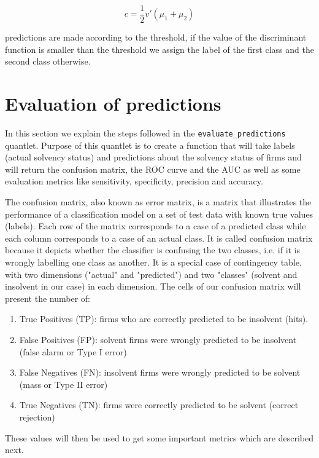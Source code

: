 \documentclass{article}
\begin{document}
\begin{equation}
c = \frac{1}{2} v \prime \left(\mu_1 + \mu_2\right) 
\end{equation}

predictions are made according to the threshold, if the value of the discriminant function is smaller than the threshold we assign the label of the first class and the second class otherwise. 

\section{Evaluation of predictions}

In this section we explain the steps followed in the \texttt{evaluate\_predictions} quantlet. Purpose of this quantlet is to create a function that will take labels (actual solvency status) and predictions about the solvency status of firms and will return the confusion matrix, the ROC curve and the AUC as well as some evaluation metrics like sensitivity, specificity, precision and accuracy.

The confusion matrix, also known as error matrix, is a matrix that illustrates the performance of a classification model on a set of test data with known true values (labels). Each row of the matrix corresponds to a case of a predicted class while each column corresponds to a case of an actual class. It is called confusion matrix because it depicts whether the classifier is confusing the two classes, i.e. if it is wrongly labelling one class as another. It is a special case of contingency table, with two dimensions ("actual" and "predicted") and two "classes" (solvent and insolvent in our case) in each dimension. The cells of our confusion matrix will present the number of:

\begin{enumerate}
\item True Positives (TP): firms who are correctly predicted to be insolvent (hits).
\item False Positives (FP): solvent firms were wrongly predicted to be insolvent (false alarm or Type I error)
\item False Negatives (FN): insolvent firms were wrongly predicted to be solvent (mass or Type II error)
\item True Negatives (TN): firms were correctly predicted to be solvent (correct rejection) 
\end{enumerate}

These values will then be used to get some important metrics which are described next.
\end{document}
